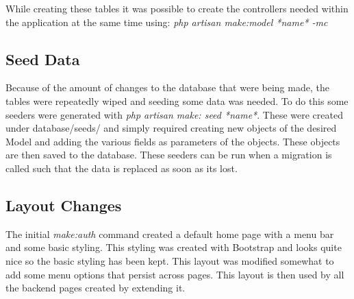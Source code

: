 \documentclass{article}
\begin{document}
While creating these tables it was possible to create the controllers needed within the application at the same time using: \textit{php artisan make:model *name* -mc } 
\subsection{Seed Data}
Because of the amount of changes to the database that were being made, the tables were repeatedly wiped and seeding some data was needed. To do this some seeders were generated with \textit{php artisan make: seed *name*}. These were created under database/seeds/ and simply required creating new objects of the desired Model and adding the various fields as parameters of the objects. These objects are then saved to the database. These seeders can be run when a migration is called such that the data is replaced as soon as its lost.
\subsection{Layout Changes}
The initial \textit{make:auth} command created a default home page with a menu bar and some basic styling. This styling was created with Bootstrap and looks quite nice so the basic styling has been kept. This layout was modified somewhat to add some menu options that persist across pages. This layout is then used by all the backend pages created by extending it.

%
%
\end{document}
